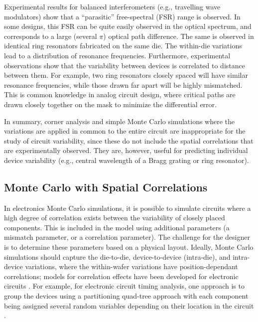 \documentclass[journal]{spie}
\begin{document}
Experimental results for balanced interferometers (e.g., travelling wave modulators) show that a ``parasitic'' free-spectral (FSR) range is observed.  In some designs, this FSR can be quite easily observed in the optical spectrum, and corresponds to a large (several $\pi$) optical path difference.  The same is observed in identical ring resonators fabricated on the same die.  The within-die variations lead to a distribution of resonance frequencies.  Furthermore, experimental observations show that the variability between devices is correlated to distance between them.  For example, two ring resonators closely spaced will have similar resonance frequencies, while those drawn far apart will be highly mismatched.  This is common knowledge in analog circuit design, where critical paths are drawn closely together on the mask to minimize the differential error. 

In summary, corner analysis and simple Monte Carlo simulations where the variations are applied in common to the entire circuit are inappropriate for the study of circuit variability, since these do not include the spatial correlations that are experimentally observed.  They are, however, useful for predicting individual device variability (e.g., central wavelength of a Bragg grating or ring resonator).


\subsection{Monte Carlo with Spatial Correlations}

In electronics Monte Carlo simulations, it is possible to simulate circuits where a high degree of correlation exists between the variability of closely placed components.  This is included in the model using additional parameters (a mismatch parameter, or a correlation parameter).  The challenge for the designer is to determine these parameters based on a physical layout.
Ideally, Monte Carlo simulations should capture the die-to-die, device-to-device (intra-die), and intra-device variations, where the within-wafer variations have position-dependant correlations; models for correlation effects have been developed for electronic circuits \cite{agarwal2003statistical, liu2008spatial, cheng2011physically, zhang2013efficient, liao2015efficient}.  For example, for electronic circuit timing analysis, one approach is to group the devices using a partitioning quad-tree approach with each component being assigned several random variables depending on their location in the circuit  \cite{agarwal2003statistical}.  
\end{document}
